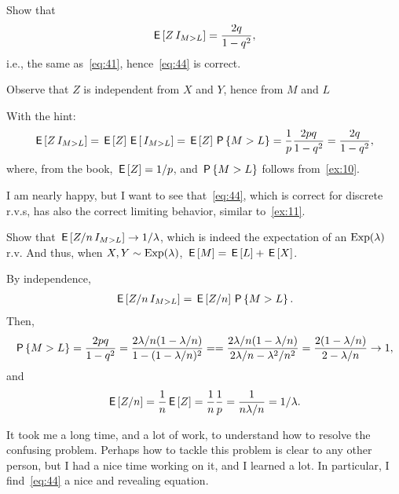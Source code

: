\documentclass[a4paper,12pt]{article}
\begin{document}
\begin{exercise}
Show that 
\begin{equation}
  \label{eq:45}
\E{Z\1{M>L}} = \frac{2q} {1-q^{2}},
\end{equation}
i.e., the same as~\cref{eq:41}, hence~\cref{eq:44} is correct.
\begin{hint}
Observe that $Z$   is independent from $X$ and $Y$, hence from $M$ and $L$
\end{hint}
\begin{solution} With the hint:
  \begin{align}
    \label{eq:46}
\E{Z\1{M>L}}  = \E Z \E{\1{M>L}} = \E Z \P{M>L} = \frac 1 p \frac{2pq}{1-q^{2}} = \frac{2q}{1-q^{2}},
  \end{align}
where, from the book, $\E Z = 1/p$, and $\P{M>L}$ follows from~\cref{ex:10}. 
\end{solution}
\end{exercise}


I am nearly happy, but I want to see that~\eqref{eq:44}, which is correct for discrete r.v.s, has also the correct limiting behavior, similar to~\cref{ex:11}. 
\begin{exercise}
Show that $\E{Z/n\1{M>L}} \to 1/\lambda$, which is indeed the expectation of an $\Exp{\lambda}$ r.v. And thus, when $X,Y\sim \Exp{\lambda}$, $\E M = \E L + \E X$.
\begin{solution}
By independence,
  \begin{align}
    \label{eq:47}
\E{Z/n\1{M>L}} = \E{Z/n} \P{M>L}. 
  \end{align}
Then,
\begin{align}
  \label{eq:49}
\P{M>L}   = \frac{2pq}{1-q^{2}} 
= \frac{2\lambda/n (1-\lambda/n)}{1-(1-\lambda/n)^{2}} = 
= \frac{2\lambda/n (1-\lambda/n)}{2\lambda/n -\lambda^{2}/n^{2}}  
= \frac{2 (1-\lambda/n)}{2 -\lambda/n}  \to 1,
\end{align}
and
\begin{align}
  \label{eq:50}
\E{Z/n} = \frac 1 n \E Z = \frac 1 n \frac 1 p = \frac 1 {n \lambda/ n} = 1/\lambda.
\end{align}
\end{solution}

\end{exercise}

It took me a long time, and a lot of work, to understand how to resolve the confusing problem.
Perhaps how to tackle this problem is clear to any other person, but I had a nice time working on it, and I learned a lot.
In particular, I find~\cref{eq:44} a nice and revealing equation.




\end{document}
